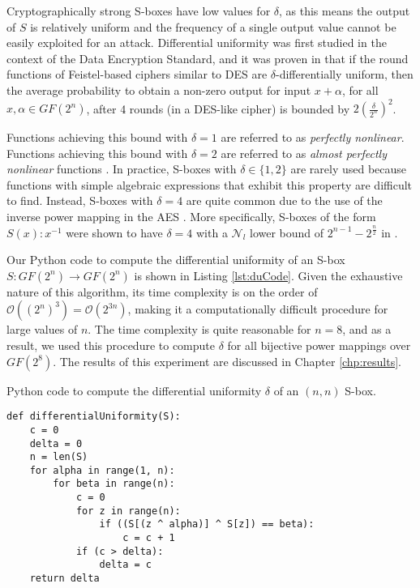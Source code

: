 Cryptographically strong S-boxes have low values for $\delta$, as this means the output of $S$ is relatively uniform and the frequency of a single output value cannot be easily exploited for an attack. Differential uniformity was first studied in the context of the Data Encryption Standard, and it was proven in \cite{Nyberg94-1} that if the round functions of Feistel-based ciphers similar to DES are $\delta$-differentially uniform, then the average probability to obtain a non-zero output for input $x + \alpha$, for all $x, \alpha \in GF(2^n)$, after 4 rounds (in a DES-like cipher) is bounded by $2(\frac{\delta}{2^n})^2$.

Functions achieving this bound with $\delta = 1$ are referred to as \emph{perfectly nonlinear}. Functions achieving this bound with $\delta = 2$ are referred to as \emph{almost perfectly nonlinear} functions \cite{Nyberg91-1}. In practice, S-boxes with $\delta \in \{1,2\}$ are rarely used because functions with simple algebraic expressions that exhibit this property are difficult to find. Instead, S-boxes with $\delta=4$ are quite common due to the use of the inverse power mapping in the AES \cite{Daemen02-1}. More specifically, S-boxes of the form $S(x) : x^{-1}$ were shown to have $\delta = 4$ with a $\mathcal{N}_l$ lower bound of $2^{n-1} - 2^{\frac{n}{2}}$ in \cite{Nyberg94-1}. 


Our Python code to compute the differential uniformity of an S-box $S : GF(2^n) \to GF(2^n)$ is shown in Listing \ref{lst:duCode}. Given the exhaustive nature of this algorithm, its time complexity is on the order of $\mathcal{O}((2^n)^3) = \mathcal{O}(2^{3n})$, making it a computationally difficult procedure for large values of $n$. The time complexity is quite reasonable for $n = 8$, and as a result, we used this procedure to compute $\delta$ for all bijective power mappings over $GF(2^8)$. The results of this experiment are discussed in Chapter \ref{chp:results}.

\begin{listing}[ht!]
\caption{Python code to compute the differential uniformity $\delta$ of an $(n, n)$ S-box.}
\begin{verbatim}
def differentialUniformity(S):
	c = 0
	delta = 0
	n = len(S)
	for alpha in range(1, n): 
		for beta in range(n):
			c = 0
			for z in range(n):
				if ((S[(z ^ alpha)] ^ S[z]) == beta):
					c = c + 1
			if (c > delta): 
				delta = c
	return delta 
\end{verbatim}
\label{lst:duCode}
\end{listing}

